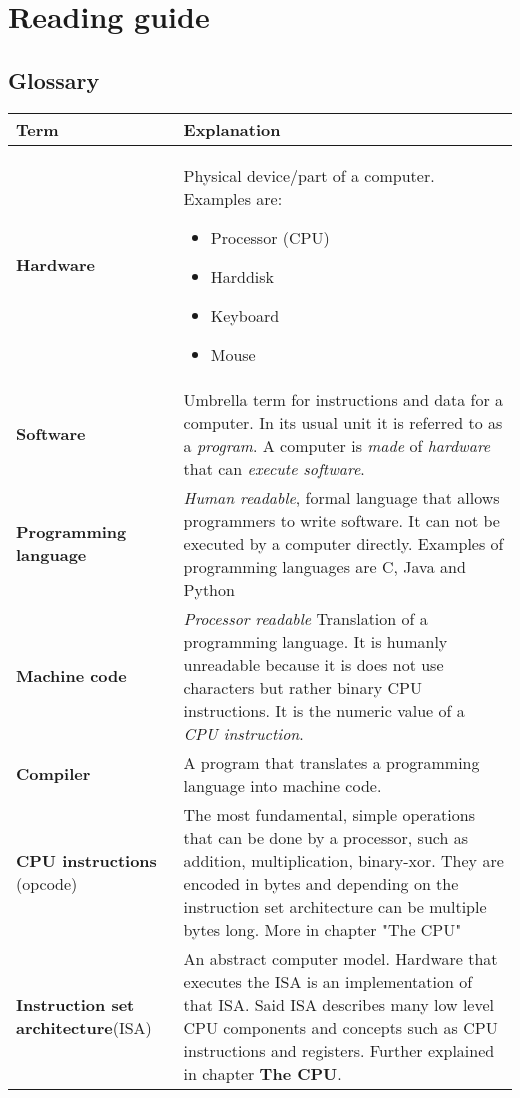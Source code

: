 \section{Reading guide}
\subsection{Glossary}
\begin{tabular}{ | m{30mm} | m{120mm} |}
\textbf{Term} & \textbf{Explanation} \\
\hline
\textbf{Hardware} & Physical device/part of a computer. Examples are: \begin{itemize}
\item Processor (CPU)
\item Harddisk
\item Keyboard
\item Mouse
\end{itemize} \\
\textbf{Software} & Umbrella term for instructions and data for a computer. In its usual unit it is referred to as a \textit{program}. A computer is \textit{made} of \textit{hardware} that can \textit{execute software}. \\
\textbf{Programming language} & \textit{Human readable}, formal language that allows programmers to write software. It can not be executed by a computer directly. Examples of programming languages are C, Java and Python \\
\textbf{Machine code} & \textit{Processor readable} Translation of a programming language. It is humanly unreadable because it is does not use characters but rather binary CPU instructions. It is the numeric value of a \textit{CPU instruction}. \\
\textbf{Compiler} & A program that translates a programming language into machine code. \\
\textbf{CPU instructions} (opcode) & The most fundamental, simple operations that can be done by a processor, such as addition, multiplication, binary-xor. They are encoded in bytes and depending on the instruction set architecture can be multiple bytes long. More in chapter "The CPU" \\
        \textbf{Instruction set architecture}(ISA) & An abstract computer model. Hardware that executes the ISA is an implementation of that ISA. Said ISA describes many low level CPU components and concepts such as CPU instructions and registers. Further explained in chapter \textbf{The CPU}. \\

\end{tabular}
